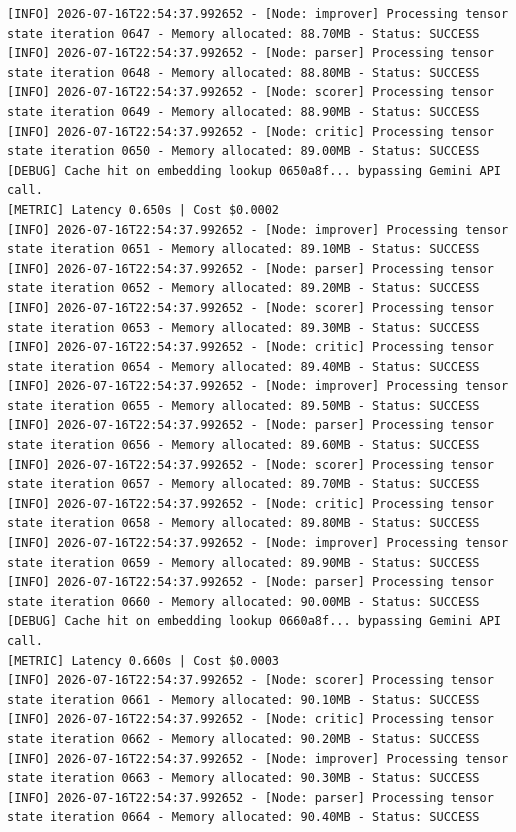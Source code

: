 \documentclass[10pt,journal,compsoc]{IEEEtran}
\begin{document}
\begin{verbatim}
[INFO] 2026-07-16T22:54:37.992652 - [Node: improver] Processing tensor state iteration 0647 - Memory allocated: 88.70MB - Status: SUCCESS
[INFO] 2026-07-16T22:54:37.992652 - [Node: parser] Processing tensor state iteration 0648 - Memory allocated: 88.80MB - Status: SUCCESS
[INFO] 2026-07-16T22:54:37.992652 - [Node: scorer] Processing tensor state iteration 0649 - Memory allocated: 88.90MB - Status: SUCCESS
[INFO] 2026-07-16T22:54:37.992652 - [Node: critic] Processing tensor state iteration 0650 - Memory allocated: 89.00MB - Status: SUCCESS
[DEBUG] Cache hit on embedding lookup 0650a8f... bypassing Gemini API call.
[METRIC] Latency 0.650s | Cost $0.0002
[INFO] 2026-07-16T22:54:37.992652 - [Node: improver] Processing tensor state iteration 0651 - Memory allocated: 89.10MB - Status: SUCCESS
[INFO] 2026-07-16T22:54:37.992652 - [Node: parser] Processing tensor state iteration 0652 - Memory allocated: 89.20MB - Status: SUCCESS
[INFO] 2026-07-16T22:54:37.992652 - [Node: scorer] Processing tensor state iteration 0653 - Memory allocated: 89.30MB - Status: SUCCESS
[INFO] 2026-07-16T22:54:37.992652 - [Node: critic] Processing tensor state iteration 0654 - Memory allocated: 89.40MB - Status: SUCCESS
[INFO] 2026-07-16T22:54:37.992652 - [Node: improver] Processing tensor state iteration 0655 - Memory allocated: 89.50MB - Status: SUCCESS
[INFO] 2026-07-16T22:54:37.992652 - [Node: parser] Processing tensor state iteration 0656 - Memory allocated: 89.60MB - Status: SUCCESS
[INFO] 2026-07-16T22:54:37.992652 - [Node: scorer] Processing tensor state iteration 0657 - Memory allocated: 89.70MB - Status: SUCCESS
[INFO] 2026-07-16T22:54:37.992652 - [Node: critic] Processing tensor state iteration 0658 - Memory allocated: 89.80MB - Status: SUCCESS
[INFO] 2026-07-16T22:54:37.992652 - [Node: improver] Processing tensor state iteration 0659 - Memory allocated: 89.90MB - Status: SUCCESS
[INFO] 2026-07-16T22:54:37.992652 - [Node: parser] Processing tensor state iteration 0660 - Memory allocated: 90.00MB - Status: SUCCESS
[DEBUG] Cache hit on embedding lookup 0660a8f... bypassing Gemini API call.
[METRIC] Latency 0.660s | Cost $0.0003
[INFO] 2026-07-16T22:54:37.992652 - [Node: scorer] Processing tensor state iteration 0661 - Memory allocated: 90.10MB - Status: SUCCESS
[INFO] 2026-07-16T22:54:37.992652 - [Node: critic] Processing tensor state iteration 0662 - Memory allocated: 90.20MB - Status: SUCCESS
[INFO] 2026-07-16T22:54:37.992652 - [Node: improver] Processing tensor state iteration 0663 - Memory allocated: 90.30MB - Status: SUCCESS
[INFO] 2026-07-16T22:54:37.992652 - [Node: parser] Processing tensor state iteration 0664 - Memory allocated: 90.40MB - Status: SUCCESS

\end{verbatim}
\end{document}
